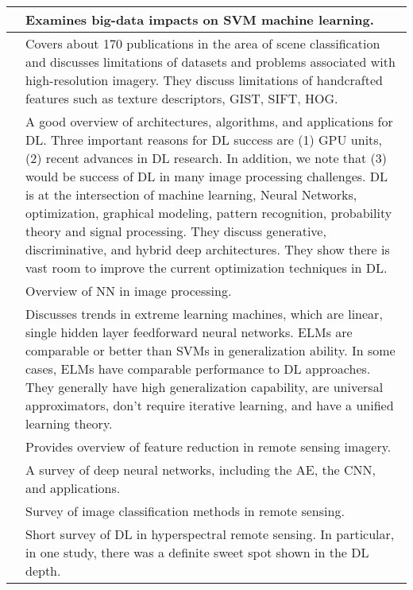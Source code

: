 \documentclass[12pt]{spieman}
\begin{document}
\begin{spacing}{1}
\begin{tabular}{|L{0.8cm}|R{15cm}|}
\cite{cavallaro2015understanding} 
& Examines big-data impacts on SVM machine learning. \\
\hline

\cite{Cheng} 
& Covers about 170 publications in the area of scene classification and discusses limitations of datasets and problems associated with high-resolution imagery. They discuss limitations of handcrafted features such as texture descriptors, GIST, SIFT, HOG. \\
\hline

\cite{Deng2014} 
& A good overview of architectures, algorithms, and applications for DL. Three important reasons for DL success are (1) GPU units, (2) recent advances in DL research. In addition, we note that (3) would be success of DL in many image processing challenges. DL is at the intersection of machine learning, Neural Networks, optimization, graphical modeling, pattern recognition, probability theory and signal processing. They discuss generative, discriminative, and hybrid deep architectures. They show there is vast room to improve the current optimization techniques in DL. \\
\hline

\cite{Egmont-Petersen2002} 
& Overview of NN in image processing. \\
\hline

\cite{huang2015trends} 
& Discusses trends in extreme learning machines, which are linear, single hidden layer feedforward neural networks. ELMs are comparable or better than SVMs in generalization ability. In some cases, ELMs have comparable performance to DL approaches. They generally have high generalization capability, are universal approximators, don't require iterative learning, and have a unified learning theory. \\
\hline

\cite{jia2013feature} 
& Provides overview of feature reduction in remote sensing imagery. \\
\hline

\cite{liu2016survey} 
& A survey of deep neural networks, including the AE, the CNN, and applications. \\
\hline

\cite{lu2007survey} 
& Survey of image classification methods in remote sensing. \\
\hline

\cite{petersson2016hyperspectral} 
& Short survey of DL in hyperspectral remote sensing. In particular, in one study, there was a definite sweet spot shown in the DL depth. \\
\hline


\end{tabular}
\end{spacing}
\end{document}

